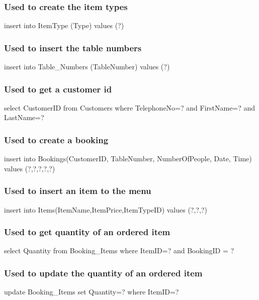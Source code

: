 \subsubsection{Used to create the item types}
\begin{sql}
insert into ItemType (Type) values (?)
\end{sql}

\subsubsection{Used to insert the table numbers}
\begin{sql}
insert into Table_Numbers (TableNumber) values (?)
\end{sql}

\subsubsection{Used to get a customer id}
\begin{sql}
select CustomerID from Customers where TelephoneNo=? and FirstName=? and LastName=?
\end{sql}

\subsubsection{Used to create a booking}
\begin{sql}
insert into Bookings(CustomerID, TableNumber, NumberOfPeople, Date, Time) values (?,?,?,?,?)
\end{sql}

\subsubsection{Used to insert an item to the menu}
\begin{sql}
insert into Items(ItemName,ItemPrice,ItemTypeID) values (?,?,?)
\end{sql}

\subsubsection{Used to get quantity of an ordered item}
\begin{sql}
select Quantity from Booking_Items where ItemID=? and BookingID = ?
\end{sql}

\subsubsection{Used to update the quantity of an ordered item}
\begin{sql}
update Booking_Items set Quantity=? where ItemID=?
\end{sql}

